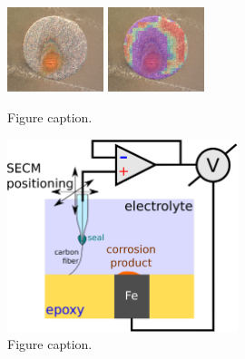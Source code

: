 \documentclass[3p]{elsarticle}
\begin{document}
\begin{figure}[H]
\includegraphics[width=0.25\textwidth]{img1.png}
\hspace{2cm}
\includegraphics[width=0.25\textwidth]{img2.png}

\caption{Figure caption.}
\label{fig:deconvolution}
\end{figure}

\begin{figure}[H]
\centering
\includegraphics[width=0.6\textwidth]{whisker.eps}
\caption{Figure caption.}
\label{fig:deconvolution}
\end{figure}
\end{document}
